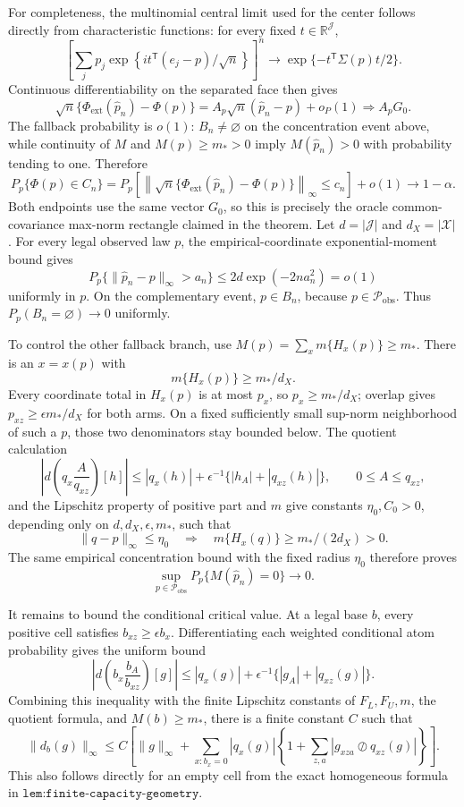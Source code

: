 For completeness, the multinomial central limit used for the center follows directly from characteristic functions: for every fixed \(t\in\mathbb R^{\mathcal J}\),
\[
\left[\sum_jp_j\exp\!\left\{i t^{\mathsf T}(e_j-p)/\sqrt n\right\}\right]^n
\longrightarrow \exp\{-t^{\mathsf T}\Sigma(p)t/2\}.
\]
Continuous differentiability on the separated face then gives
\[
\sqrt n\{\Phi_{\mathrm{ext}}(\widehat p_n)-\Phi(p)\}
=A_p\sqrt n(\widehat p_n-p)+o_P(1)
\Rightarrow A_pG_0.
\]
The fallback probability is \(o(1)\): \(B_n\ne\varnothing\) on the concentration event above, while continuity of \(M\) and \(M(p)\ge m_*>0\) imply \(M(\widehat p_n)>0\) with probability tending to one.  Therefore
\[
P_p\{\Phi(p)\in C_n\}
=P_p\!\left[\left\|\sqrt n\{\Phi_{\mathrm{ext}}(\widehat p_n)-\Phi(p)\}\right\|_\infty\le c_n\right]+o(1)
\longrightarrow 1-\alpha.
\]
Both endpoints use the same vector \(G_0\), so this is precisely the oracle common-covariance max-norm rectangle claimed in the theorem.
Let \(d=|\mathcal J|\) and \(d_X=|\mathcal X|\).  For every legal observed law \(p\), the empirical-coordinate exponential-moment bound gives
\[
P_p\{\|\widehat p_n-p\|_\infty>a_n\}
\le2d\exp(-2na_n^2)=o(1)
\]
uniformly in \(p\).  On the complementary event, \(p\in B_n\), because \(p\in\mathcal P_{\mathrm{obs}}\).  Thus \(P_p(B_n=\varnothing)\to0\) uniformly.

To control the other fallback branch, use \(M(p)=\sum_xm\{H_x(p)\}\ge m_*\).  There is an \(x=x(p)\) with
\[
m\{H_x(p)\}\ge m_*/d_X.
\]
Every coordinate total in \(H_x(p)\) is at most \(p_x\), so \(p_x\ge m_*/d_X\); overlap gives \(p_{xz}\ge\epsilon m_*/d_X\) for both arms.  On a fixed sufficiently small sup-norm neighborhood of such a \(p\), those two denominators stay bounded below.  The quotient calculation
\[
\left|d\left(q_x\frac{A}{q_{xz}}\right)[h]\right|
\le |q_x(h)|+\epsilon^{-1}\{|h_A|+|q_{xz}(h)|\},
\qquad 0\le A\le q_{xz},
\]
and the Lipschitz property of positive part and \(m\) give constants \(\eta_0,C_0>0\), depending only on \(d,d_X,\epsilon,m_*\), such that
\[
\|q-p\|_\infty\le\eta_0
\quad\Longrightarrow\quad
m\{H_x(q)\}\ge m_*/(2d_X)>0.
\]
The same empirical concentration bound with the fixed radius \(\eta_0\) therefore proves
\[
\sup_{p\in\mathcal P_{\mathrm{obs}}}P_p\{M(\widehat p_n)=0\}\longrightarrow0.
\]

It remains to bound the conditional critical value.  At a legal base \(b\), every positive cell satisfies \(b_{xz}\ge\epsilon b_x\).  Differentiating each weighted conditional atom probability gives the uniform bound
\[
\left|d\left(b_x\frac{b_A}{b_{xz}}\right)[g]\right|
\le |q_x(g)|+\epsilon^{-1}\{|g_A|+|q_{xz}(g)|\}.
\]
Combining this inequality with the finite Lipschitz constants of \(F_L,F_U,m\), the quotient formula, and \(M(b)\ge m_*\), there is a finite constant \(C\) such that
\[
\|d_b(g)\|_\infty
\le C\left[\|g\|_\infty+
\sum_{x:b_x=0}|q_x(g)|
\left\{1+\sum_{z,a}|g_{xza}\oslash q_{xz}(g)|\right\}\right].
\tag{1}
\]
This also follows directly for an empty cell from the exact homogeneous formula in \(\texttt{lem:finite-capacity-geometry}\).

